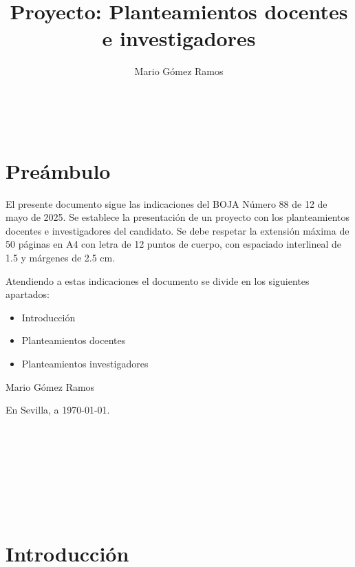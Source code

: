 \documentclass[a4paper,12pt,twoside]{article}
\begin{document}

\title{\textbf{Proyecto: Planteamientos docentes e investigadores}}
\author{Mario G\'omez Ramos}
\maketitle

\thispagestyle{empty}
\newpage
\thispagestyle{empty}  

~ \\


\newpage
\section*{Pre\'ambulo}

El presente documento sigue las indicaciones del BOJA Número 88 de 12 de mayo de 2025. Se establece la presentación de un proyecto con los planteamientos docentes e investigadores del candidato. Se debe respetar la extensión máxima de 50 páginas en A4 con letra de 12 puntos de cuerpo, con espaciado interlineal de 1.5 y márgenes de 2.5 cm.

Atendiendo a estas indicaciones el documento se divide en los siguientes apartados:

\begin{itemize}
\item Introducción
\item Planteamientos docentes
\item Planteamientos investigadores
\end{itemize}

\vfill


Mario G\'omez Ramos

En Sevilla, a \today.

~ \\

~ \\

~ \\


\newpage

~ \\
%
%
\newpage

\tableofcontents
\newpage

~ \\




\section{Introducci\'on}
\label{intro}
\end{document}
